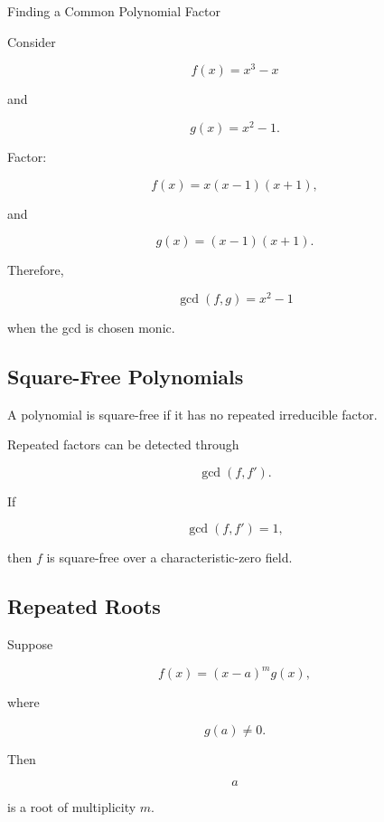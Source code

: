 \begin{workedexamplebox}{Finding a Common Polynomial Factor}

Consider

\[
f(x)
=
x^3-x
\]

and

\[
g(x)
=
x^2-1.
\]

Factor:

\[
f(x)
=
x(x-1)(x+1),
\]

and

\[
g(x)
=
(x-1)(x+1).
\]

Therefore,

\begin{answerbox}
\[
\boxed{
\gcd(f,g)
=
x^2-1
}
\]
\end{answerbox}

when the gcd is chosen monic.

\end{workedexamplebox}

\subsection{Square-Free Polynomials}
\label{subsec:square-free-polynomials}

A polynomial is square-free if it has no repeated irreducible factor.

Repeated factors can be detected through

\[
\boxed{
\gcd
(
f,f'
).
}
\]

If

\[
\gcd(f,f')=1,
\]

then \(f\) is square-free over a characteristic-zero field.

\subsection{Repeated Roots}
\label{subsec:symbolic-repeated-roots}

Suppose

\[
f(x)
=
(x-a)^m g(x),
\]

where

\[
g(a)\neq0.
\]

Then

\[
a
\]

is a root of multiplicity \(m\).

